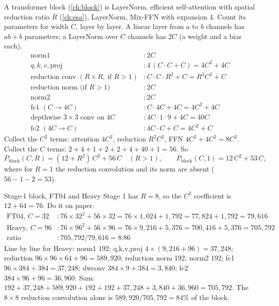 A transformer block (\cref{ch:block}) is LayerNorm, efficient self-attention with spatial reduction ratio $R$
(\cref{ch:esa}), LayerNorm, Mix-FFN with expansion 4. Count its parameters for width $C$, layer by layer. A
linear layer from $a$ to $b$ channels has $ab+b$ parameters; a LayerNorm over $C$ channels has $2C$ (a weight and a
bias each).
\begin{align*}
\text{norm1} &: 2C\\
q,k,v,\text{proj} &: 4\,(C\cdot C + C) = 4C^2 + 4C\\
\text{reduction conv } (R\times R,\ \text{if } R>1) &: C\cdot C\cdot R^2 + C = R^2C^2 + C\\
\text{reduction norm (if } R>1) &: 2C\\
\text{norm2} &: 2C\\
\text{fc1 } (C\to4C) &: C\cdot4C + 4C = 4C^2 + 4C\\
\text{depthwise }3\times3\text{ conv on }4C &: 4C\cdot1\cdot9 + 4C = 40C\\
\text{fc2 } (4C\to C) &: 4C\cdot C + C = 4C^2 + C
\end{align*}
Collect the $C^2$ terms: attention $4C^2$, reduction $R^2C^2$, FFN $4C^2+4C^2=8C^2$. Collect the $C$ terms:
$2+4+1+2+2+4+40+1=56$. So
\begin{equation}\label{eq:heavy:block}
P_\text{block}(C,R) = (12+R^2)\,C^2 + 56\,C \quad (R>1),\qquad P_\text{block}(C,1) = 12\,C^2 + 53\,C,
\end{equation}
where for $R=1$ the reduction convolution and its norm are absent ($56-1-2=53$).

\begin{worked}[label={we:heavy:block1}]{Stage-1 block, FT04 and Heavy}
Stage 1 has $R=8$, so the $C^2$ coefficient is $12+64=76$. Do it on paper.
\begin{align*}
\text{FT04, } C=32 &: 76\times32^2 + 56\times32 = 76\times1{,}024 + 1{,}792 = 77{,}824 + 1{,}792 = 79{,}616\\
\text{Heavy, } C=96 &: 76\times96^2 + 56\times96 = 76\times9{,}216 + 5{,}376 = 700{,}416 + 5{,}376 = 705{,}792\\
\text{ratio} &: 705{,}792/79{,}616 = 8.86
\end{align*}
Line by line for Heavy: norm1 192; q,k,v,proj $4\times(9{,}216+96)=37{,}248$; reduction
$96\times96\times64+96=589{,}920$; reduction norm 192; norm2 192; fc1 $96\times384+384=37{,}248$; dwconv
$384\times9+384=3{,}840$; fc2 $384\times96+96=36{,}960$. Sum: $192+37{,}248+589{,}920+192+192+37{,}248+3{,}840+36{,}960=705{,}792$.
The $8\times8$ reduction convolution alone is $589{,}920/705{,}792=84\%$ of the block.
\end{worked}

